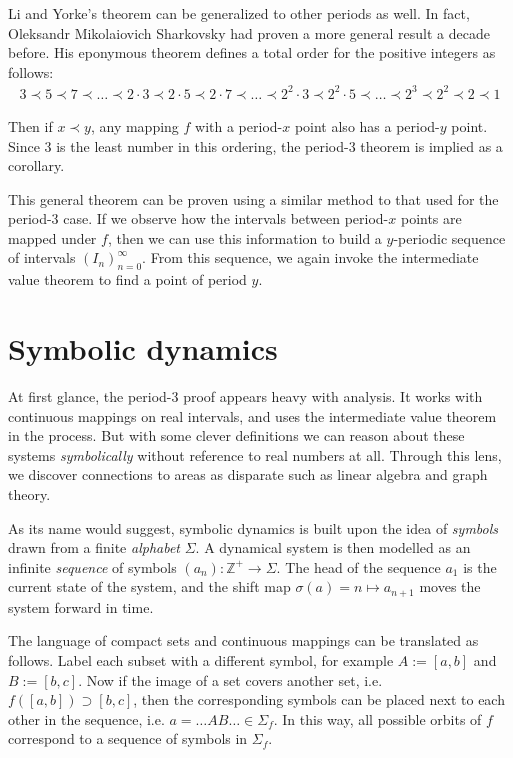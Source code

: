 \documentclass{article}
\newcommand{\Z}{\mathbb{Z}}
\begin{document}
Li and Yorke's theorem can be generalized to other periods as well. In fact, Oleksandr Mikolaiovich Sharkovsky had proven a more general result a decade before.\cite{MR0159905} His eponymous theorem defines a total order for the positive integers as follows:
\begin{align*}
    3 \prec 5 \prec 7 \prec\ldots\prec
    2 \cdot 3 \prec 2 \cdot 5 \prec 2 \cdot 7 \prec\ldots\prec
    2^2 \cdot 3 \prec 2^2 \cdot 5 \prec\ldots\prec
    2^3 \prec 2^2 \prec 2 \prec 1
\end{align*}

Then if $x \prec y$, any mapping $f$ with a period-$x$ point also has a period-$y$ point. Since $3$ is the least number in this ordering, the period-3 theorem is implied as a corollary.

This general theorem can be proven using a similar method to that used for the period-3 case. If we observe how the intervals between period-$x$ points are mapped under $f$, then we can use this information to build a $y$-periodic sequence of intervals $(I_n)_{n=0}^\infty$. From this sequence, we again invoke the intermediate value theorem to find a point of period $y$.

\section{Symbolic dynamics}

At first glance, the period-3 proof appears heavy with analysis. It works with continuous mappings on real intervals, and uses the intermediate value theorem in the process. But with some clever definitions we can reason about these systems \emph{symbolically} without reference to real numbers at all. Through this lens, we discover connections to areas as disparate such as linear algebra and graph theory.

As its name would suggest, symbolic dynamics is built upon the idea of \emph{symbols} drawn from a finite \emph{alphabet} $\Sigma$. A dynamical system is then modelled as an infinite \emph{sequence} of symbols $(a_n) : \Z^+ \rightarrow \Sigma$. The head of the sequence $a_1$ is the current state of the system, and the shift map $\sigma(a) = n \mapsto a_{n+1}$ moves the system forward in time.

The language of compact sets and continuous mappings can be translated as follows. Label each subset with a different symbol, for example $A := [a, b]$ and $B := [b, c]$. Now if the image of a set covers another set, i.e. $f([a, b]) \supset [b, c]$, then the corresponding symbols can be placed next to each other in the sequence, i.e. $a = \ldots AB \ldots \in \Sigma_f$. In this way, all possible orbits of $f$ correspond to a sequence of symbols in $\Sigma_f$.
\end{document}
